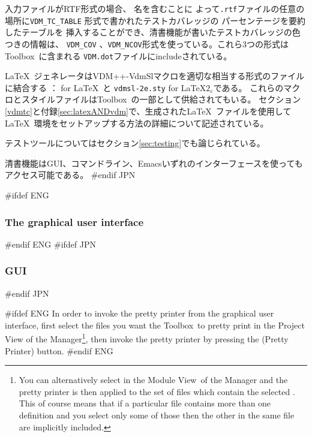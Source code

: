 \documentclass[\pformat,12pt]{article}
\newcommand{\Toolbox}{Toolbox}
\newcommand{\vdmModView}{\guicmd{Module View}}
\newcommand{\vdmModView}{\guicmd{モジュールビュー}}
\newcommand{\Toolbox}{Toolbox}
\newcommand{\vdmModView}{\guicmd{VDM View}}
\newcommand{\vdmModView}{\guicmd{VDMビュー}}
\newcommand{\guicmd}[1]{{\sf #1}}
\newcommand{\guicmd}[1]{{\gt #1}}
\begin{document}
入力ファイルがRTF形式の場合、 名を含むことに
よって{\tt .rtf}ファイルの任意の場所に\texttt{VDM\_TC\_TABLE} 形式で書かれたテストカバレッジの
パーセンテージを要約したテーブルを
挿入することができ、清書機能が書いたテストカバレッジの色つきの情報は、
 \texttt{VDM\_COV}  、\texttt{VDM\_NCOV}形式を使っている。これら3つの形式は\Toolbox\ に含まれる
{\tt VDM.dot}ファイルにincludeされている。

\LaTeX\ ジェネレータはVDM++-VdmSlマクロを適切な相当する形式のファイルに結合する
： for \LaTeX\ と 
{\tt vdmsl-2e.sty} for \LaTeX$2_{\varepsilon}$である。
これらのマクロとスタイルファイルは\Toolbox\ の一部として供給されてもいる。
セクション\ref{vdmtc}と付録\ref{sec:latexANDvdm}で、生成された\LaTeX\ ファイルを使用して
\LaTeX\ 環境をセットアップする方法の詳細について記述されている。

テストツールについてはセクション\ref{sec:testing}でも論じられている。

清書機能はGUI、コマンドライン、Emacsいずれのインターフェースを使ってもアクセス可能である。
#endif JPN

#ifdef ENG
\subsubsection{The graphical user interface}
#endif ENG
#ifdef JPN
\subsubsection{GUI}
#endif JPN

#ifdef ENG
In order to invoke the pretty printer from the graphical user
interface, first select the files you want the \Toolbox\ to pretty
print in the \guicmd{Project View} of the
\guicmd{Manager}\footnote{You can alternatively select
   in the 
  \vdmModView\ of the \guicmd{Manager} and the pretty printer is
  then applied to the set of files which contain the selected
  . This of course means
  that if a particular file contains 
  more than one  definition and you
  select only some of those 
  then the other  in the
  same file are implicitly included.}, then 
invoke the pretty printer by  pressing the  
(\guicmd{Pretty Printer}) button.
#endif ENG
\end{document}
